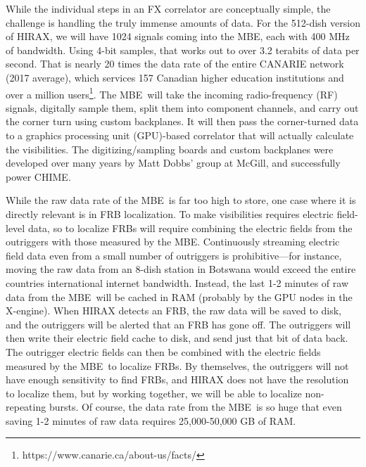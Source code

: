 \documentclass[letterpaper,11pt,preprint]{aastex}
\newcommand{\mbe}{{\rm MBE}}
\begin{document}
While the individual steps in an FX correlator are conceptually
simple, the challenge is handling the truly immense amounts of data.
For the 512-dish version of HIRAX, we will have 1024 signals coming
into the \mbe, each with 400 MHz of bandwidth.  Using 4-bit
samples, that works out to over 3.2 terabits of data per second.  That
is nearly 20 times the data rate of the entire CANARIE network (2017
average), which services 157 Canadian higher education institutions
and over a million
users\footnote{https://www.canarie.ca/about-us/facts/}.  The
\mbe\ will take the incoming radio-frequency (RF) signals, digitally
sample them, split them into component channels, and carry out the
corner turn using custom backplanes.  It will then pass the
corner-turned data to a graphics processing unit (GPU)-based
correlator that will actually calculate the visibilities.  The
digitizing/sampling boards and custom backplanes were developed over
many years by Matt Dobbs' group at McGill, and successfully power CHIME.

While the raw data rate of the \mbe\ is far too high to store, one
case where it is directly relevant is in FRB localization.  To make
visibilities requires electric field-level data, so to localize FRBs
will require combining the electric fields from the outriggers with
those measured by the \mbe.  Continuously streaming electric field
data even from a small number of outriggers is prohibitive---for
instance, moving the raw data from an 8-dish station in Botswana would
exceed the entire countries international internet bandwidth.
Instead, the last 1-2 minutes of raw data from the \mbe\ will be
cached in RAM (probably by the GPU nodes in the X-engine).  When HIRAX
detects an FRB, the raw data will be saved to disk, and the outriggers
will be alerted that an FRB has gone off.  The outriggers will then
write their electric field cache to disk, and send just that bit of
data back.  The outrigger electric fields can then be combined with
the electric fields measured by the \mbe\ to localize FRBs.  By
themselves, the outriggers will not have enough sensitivity to find
FRBs, and HIRAX does not have the resolution to localize them, but by
working together, we will be able to localize non-repeating bursts.
Of course, the data rate from the \mbe\ is so huge that even saving
1-2 minutes of raw data requires 25,000-50,000 GB of RAM.

\end{document}
